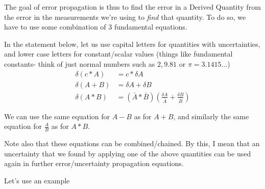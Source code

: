 \documentclass{article}
\begin{document}
The goal of error propagation is thus to find the error in a Derived Quantity from the error in the measurements we're using to \emph{find} that quantity. To do so, we have to use some combination of 3 fundamental equations.

\begin{lemma}
  In the statement below, let us use capital letters for quantities with uncertainties, and lower case letters for constant/scalar values (things like fundamental constants- think of just normal numbers such as $2, 9.81$ or $\pi = 3.1415\ldots$)
  \begin{align}
    \delta \left(c*A\right) &= c*\delta A \label{eq:scalar}\\
    \delta\left(A+B\right) &= \delta A + \delta B \label{eq:add}\\
    \delta\left(A * B\right) &= \left(\bar{A}*\bar{B}\right)\left(\frac{\delta A}{\bar{A}} + \frac{\delta B}{\bar{B}}\right)\label{eq:mult}
  \end{align}
\end{lemma}

\begin{note}
  We can use the same equation for $A-B$ as for $A+B$, and similarly the same equation for $\frac{A}{B}$ as for $A*B$.
\end{note}

Note also that these equations can be combined/chained. By this, I mean that an uncertainty that we found by applying one of the above quantities can be used again in further error/uncertainty propagation equations.

Let's use an example
\end{document}
